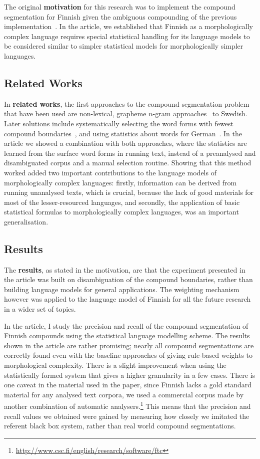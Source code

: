 \documentclass[officiallayout,final]{unihelcompling}
\begin{document}
The original \textbf{motivation} for this research was to implement the
compound segmentation for Finnish given the ambiguous compounding of the
previous implementation~\citep{pirinen2008suomen}. In the article, we
established that Finnish as a morphologically complex language requires special
statistical handling for its language models to be considered similar to
simpler statistical models for morphologically simpler languages.

\subsection{Related Works}

In \textbf{related works}, the first approaches to the compound segmentation
problem that have been used are non-lexical, grapheme \(n\)-gram
approaches~\citep[referred to in]{kokkinakis2008semantically} to Swedish. Later
solutions include systematically selecting the word forms with fewest compound
boundaries~\citep{karlsson1992swetwol}, and using statistics about
words for German~\citep{schiller2006german}. In the article we showed a combination with
both approaches, where the statistics are learned from the surface word forms
in running text, instead of a preanalysed and disambiguated corpus and a
manual selection routine.  Showing that this method worked added two important
contributions to the language models of morphologically complex languages:
firstly, information can be derived from running unanalysed texts, which is
crucial, because the lack of good materials for most of the lesser-resourced
languages, and secondly, the application of basic statistical formulas to
morphologically complex languages, was an important generalisation.

\subsection{Results}

The \textbf{results}, as stated in the motivation, are that the experiment
presented in the article was built on disambiguation of the compound
boundaries, rather than building language models for general applications. The
weighting mechanism however was applied to the language model of Finnish for
all the future research in a wider set of topics.

In the article, I study the precision and recall of the compound segmentation
of Finnish compounds using the statistical language modelling scheme. The
results shown in the article are rather promising; nearly all compound
segmentations are correctly found even with the baseline approaches of giving
rule-based weights to morphological complexity. There is a slight improvement
when using the statistically formed system that gives a higher granularity in a
few cases.  There is one caveat in the material used in the paper, since
Finnish lacks a gold standard material for any analysed text corpora, we used a
commercial corpus made by another combination of automatic
analysers.\footnote{\url{http://www.csc.fi/english/research/software/ftc}} This
means that the precision and recall values we obtained were gained by measuring
how closely we imitated the referent black box system, rather than real world
compound segmentations.
\end{document}
